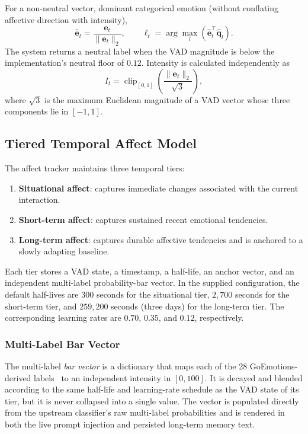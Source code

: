 \documentclass[graybox]{svmult}
\begin{document}
For a non-neutral vector, dominant categorical emotion (without conflating affective direction with intensity),
\begin{equation}
\hat{\mathbf{e}}_t =
\frac{\mathbf{e}_t}{\|\mathbf{e}_t\|_2},
\qquad
\ell_t =
\arg\max_{l}
\left(
\hat{\mathbf{e}}_t^\top \hat{\mathbf{q}}_l
\right).
\label{eq:cosine_projection}
\end{equation}
The system returns a neutral label when the VAD magnitude is below the implementation's neutral floor of $0.12$. Intensity is calculated independently as
\begin{equation}
I_t =
\operatorname{clip}_{[0,1]}
\left(
\frac{\|\mathbf{e}_t\|_2}{\sqrt{3}}
\right),
\label{eq:intensity}
\end{equation}
where $\sqrt{3}$ is the maximum Euclidean magnitude of a VAD vector whose three components lie in $[-1,1]$.

\subsection{Tiered Temporal Affect Model}
\label{subsec:tiered_affect}

The affect tracker maintains three temporal tiers:
\begin{enumerate}
    \item \textbf{Situational affect}: captures immediate changes associated with the current interaction.
    \item \textbf{Short-term affect}: captures sustained recent emotional tendencies.
    \item \textbf{Long-term affect}: captures durable affective tendencies and is anchored to a slowly adapting baseline.
\end{enumerate}

Each tier stores a VAD state, a timestamp, a half-life, an anchor vector, and an independent multi-label probability-bar vector. In the supplied configuration, the default half-lives are $300$ seconds for the situational tier, $2{,}700$ seconds for the short-term tier, and $259{,}200$ seconds (three days) for the long-term tier. The corresponding learning rates are $0.70$, $0.35$, and $0.12$, respectively.



\subsubsection{Multi-Label Bar Vector} The multi-label \emph{bar vector} is a dictionary that maps each of the 28
GoEmotions-derived labels~\cite{demszky2020goemotions} to an independent intensity in $[0,100]$.
It is decayed and blended according to the same half-life and learning-rate schedule
as the VAD state of its tier, but it is never collapsed into a single value. The vector is
populated directly from the upstream classifier's raw multi-label
probabilities and is rendered in both the live prompt injection and persisted long-term memory text.
\end{document}
